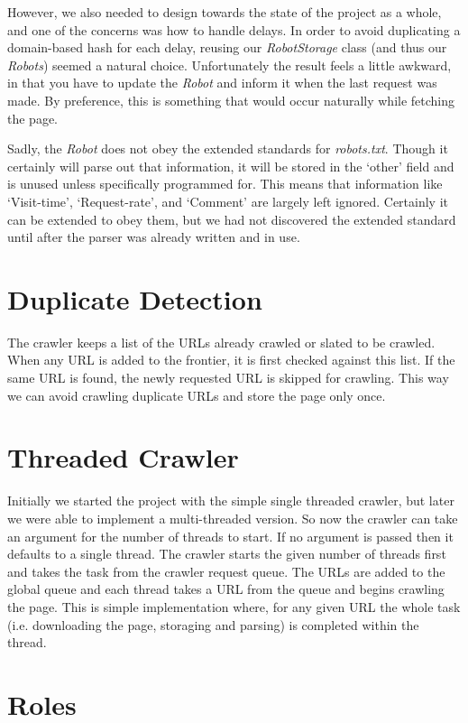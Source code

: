 \documentclass[letterpaper,11pt,twoside]{article}
\begin{document}
However, we also needed to design towards the state of the project as a whole, and one of the concerns was how to handle delays. In order to avoid duplicating a domain-based hash for each delay, reusing our \emph{RobotStorage} class (and thus our \emph{Robots}) seemed a natural choice. Unfortunately the result feels a little awkward, in that you have to update the \emph{Robot} and inform it when the last request was made. By preference, this is something that would occur naturally while fetching the page.

Sadly, the \emph{Robot} does not obey the extended standards for \emph{robots.txt}. Though it certainly will parse out that information, it will be stored in the `other' field and is unused unless specifically programmed for. This means that information like `Visit-time', `Request-rate', and `Comment' are largely left ignored. Certainly it can be extended to obey them, but we had not discovered the extended standard until after the parser was already written and in use.

\section{Duplicate Detection}
The crawler keeps a list of the URLs already crawled or slated to be crawled. When any URL is added to the frontier, it is first checked against this list. If the same URL is found, the newly requested URL is skipped for crawling. This way we can avoid crawling duplicate URLs and store the page only once.

\section{Threaded Crawler}
Initially we started the project with the simple single threaded crawler, but later we were able to implement a multi-threaded version. So now the crawler can take an argument for the number of threads to start. If no argument is passed then it defaults to a single thread. The crawler starts the given number of threads first and takes the task from the crawler request queue. The URLs are added to the global queue and each thread takes a URL from the queue and begins crawling the page. This is simple implementation where, for any given URL the whole task (i.e. downloading the page, storaging and parsing) is completed within the thread.

\section{Roles}
\end{document}
